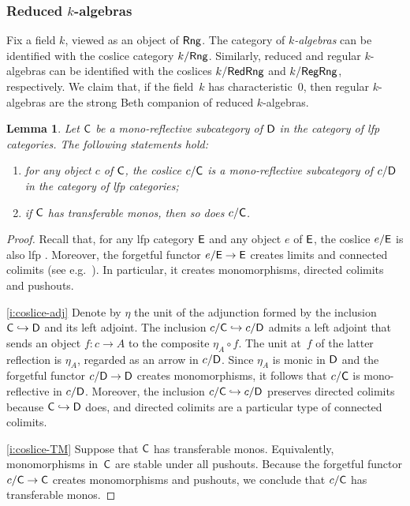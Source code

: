 \documentclass[a4paper,10pt,reqno]{amsart}
\newtheorem{lemma}[theorem]{Lemma}
\theoremstyle{definition}
\theoremstyle{remark}
\newcommand{\cat}{{\sf C}}								%
\newcommand{\catt}{{\sf D}}								%
\newcommand{\Rng}{{\sf Rng}}								%
\newcommand{\RegRng}{{\sf RegRng}}						%
\newcommand{\RedRng}{{\sf RedRng}}						%
\newcommand{\into}{\hookrightarrow}						%
\begin{document}
\subsubsection*{Reduced $k$-algebras} 

Fix a field $k$, viewed as an object of $\Rng$. The category of \emph{$k$-algebras} can be identified with the coslice category $k/\Rng$. Similarly, reduced and regular $k$-algebras can be identified with the coslices $k/\RedRng$ and $k/\RegRng$, respectively. We claim that, if the field~$k$ has characteristic~$0$, then regular $k$-algebras are the strong Beth companion of reduced $k$-algebras.

\begin{lemma}\label{l:monoreflection-coslices}
Let $\cat$ be a mono-reflective subcategory of $\catt$ in the category of lfp categories. The following statements hold:
\begin{enumerate}[label=(\roman*)]
\item\label{i:coslice-adj} for any object $c$ of $\cat$, the coslice $c/\cat$ is a mono-reflective subcategory of $c/\catt$ in the category of lfp categories;
\item\label{i:coslice-TM} if $\cat$ has transferable monos, then so does $c/\cat$.
\end{enumerate}
\end{lemma}

\begin{proof}
Recall that, for any lfp category $\sf E$ and any object $e$ of $\sf E$, the coslice $e/{\sf E}$ is also lfp \cite[Proposition~1.57]{ar94book}. Moreover, the forgetful functor $e/{\sf E}\to {\sf E}$ creates limits and connected colimits (see e.g.\ \cite[Proposition~3.3.8]{Riehl2016book}). In particular, it creates monomorphisms, directed colimits and pushouts.

\ref{i:coslice-adj} Denote by $\eta$ the unit of the adjunction formed by the inclusion $\cat \into \catt$ and its left adjoint. The inclusion $c/\cat \into c/\catt$ admits a left adjoint that sends an object $f\colon c\to A$ to the composite $\eta_{A} \circ f$. The unit at~$f$ of the latter reflection is $\eta_{A}$, regarded as an arrow in $c/\catt$. Since $\eta_{A}$ is monic in $\catt$ and the forgetful functor $c/\catt\to \catt$ creates monomorphisms, it follows that $c/\cat$ is mono-reflective in $c/\catt$. Moreover, the inclusion $c/\cat\into c/\catt$ preserves directed colimits because $\cat\into \catt$ does, and directed colimits are a particular type of connected colimits.

\ref{i:coslice-TM} Suppose that $\cat$ has transferable monos. Equivalently, monomorphisms in~$\cat$ are stable under all pushouts. Because the forgetful functor $c/\cat\to \cat$ creates monomorphisms and pushouts, we conclude that $c/\cat$ has transferable monos.
\end{proof}
\end{document}
